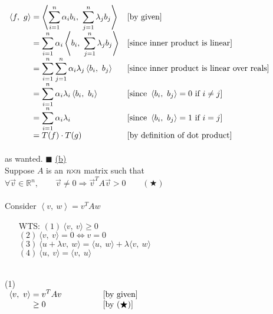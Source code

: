 \documentclass[12pt]{article}
\newcommand{\timesSmall}{{\mkern-2mu\times\mkern-2mu}}
\newcommand{\R}{\mathbb{R}}
\newcommand{\innerproduct}[2]{\left\langle #1, \ #2\right\rangle}
\renewcommand{\qed}{\hfill$\blacksquare$}
\begin{document}
{$\begin{array}{r@{}>{\displaystyle}ll}
		\innerproduct{f}{g} & {}= \innerproduct{\sum_{i = 1}^{n}\alpha_ib_i}{\sum_{j = 1}^{n}\lambda_jb_j}      & [\text{by given}]                                                  \\
		                    & {}= \sum_{i = 1}^{n} \alpha_i \innerproduct{b_i}{\sum_{j = 1}^{n}\lambda_jb_j}    & [\text{since inner product is linear}]                             \\
		                    & {}= \sum_{i = 1}^{n}  \sum_{j = 1}^{n}  \alpha_i\lambda_j \innerproduct{b_i}{b_j} & [\text{since inner product is linear over reals}]                  \\
		                    & {}= \sum_{i = 1}^{n}   \alpha_i\lambda_i \innerproduct{b_i}{b_i}                  & [\text{since } \innerproduct{b_i}{b_j} = 0 \text{ if } i \not = j] \\
		                    & {}= \sum_{i = 1}^{n}   \alpha_i\lambda_i                                          & [\text{since } \innerproduct{b_i}{b_j} = 1 \text{ if } i = j]      \\
		                    & {}= T(f)\cdot T(g)                                                                & [\text{by definition of dot product}]                              \\
	\end{array}$}
\\\\
as wanted. \qed \newpage
\hyperlink{toc}{\hypertarget{3.2}{(b)}}\\
Suppose $A$ is an $n\timesSmall n$ matrix such that\\
$\forall \vec{v} \in \R^n, \qquad \vec{v} \not = 0 \Longrightarrow \vec{v}^T A\vec{v} > 0 \qquad (\bigstar)$
\\\\
Consider $\innerproduct{v}{w} = v^T A w$
\begin{itemize}[leftmargin=12mm]
	\item[WTS:] $(1)\ \langle v, \ v \rangle \geq 0 $\\
	      $(2)\ \langle v, \ v \rangle = 0  \iff  v = 0$\\
	      $(3)\ \langle u+\lambda v, \ w \rangle = \langle u, \ w \rangle + \lambda\langle v, \ w \rangle$\\
	      $(4)\ \langle u, \ v \rangle = \langle v, \ u \rangle $
\end{itemize}
\leavevmode\\
(1)\\ {$\begin{array}{r@{}>{\displaystyle}ll}
		\langle v, \ v \rangle & {}= v^T A v \qquad \qquad & [\text{by given}]      \\
		                       & {}\geq 0                  & [\text{by }(\bigstar)] \\
	\end{array}$}
\end{document}
